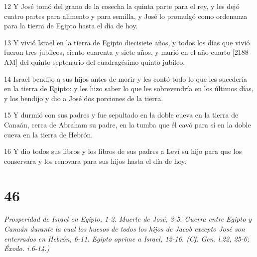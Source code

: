 \par 12 Y José tomó del grano de la cosecha la quinta parte para el rey, y les dejó cuatro partes para alimento y para semilla, y José lo promulgó como ordenanza para la tierra de Egipto hasta el día de hoy.
\par 13 Y vivió Israel en la tierra de Egipto diecisiete años, y todos los días que vivió fueron tres jubileos, ciento cuarenta y siete años, y murió en el año cuarto [2188 AM] del quinto septenario del cuadragésimo quinto jubileo.
\par 14 Israel bendijo a sus hijos antes de morir y les contó todo lo que les sucedería en la tierra de Egipto; y les hizo saber lo que les sobrevendría en los últimos días, y los bendijo y dio a José dos porciones de la tierra.
\par 15 Y durmió con sus padres y fue sepultado en la doble cueva en la tierra de Canaán, cerca de Abraham su padre, en la tumba que él cavó para sí en la doble cueva en la tierra de Hebrón.
\par 16 Y dio todos sus libros y los libros de sus padres a Leví su hijo para que los conservara y los renovara para sus hijos hasta el día de hoy.

\chapter{46}

\par \textit{Prosperidad de Israel en Egipto, 1-2. Muerte de José, 3-5. Guerra entre Egipto y Canaán durante la cual los huesos de todos los hijos de Jacob excepto José son enterrados en Hebrón, 6-11. Egipto oprime a Israel, 12-16. (Cf. Gen. l.22, 25-6; Éxodo. i.6-14.)}

